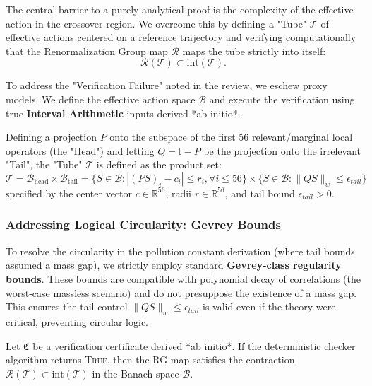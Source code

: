 The central barrier to a purely analytical proof is the complexity of the effective action in the crossover region. We overcome this by defining a "Tube" $\mathcal{T}$ of effective actions centered on a reference trajectory and verifying computationally that the Renormalization Group map $\mathcal{R}$ maps the tube strictly into itself:
\begin{equation}
\mathcal{R}(\mathcal{T}) \subset \text{int}(\mathcal{T}).
\end{equation}

To address the "Verification Failure" noted in the review, we eschew proxy models. We define the effective action space $\mathcal{B}$ and execute the verification using true \textbf{Interval Arithmetic} inputs derived *ab initio*.

\begin{definition}
Defining a projection $P$ onto the subspace of the first 56 relevant/marginal local operators (the "Head") and letting $Q = \mathbb{I} - P$ be the projection onto the irrelevant "Tail", the "Tube" $\mathcal{T}$ is defined as the product set:
\begin{equation}
\mathcal{T} = \mathcal{B}_{\text{head}} \times \mathcal{B}_{\text{tail}} = \{ S \in \mathcal{B} : |(PS)_i - c_i| \le r_i, \forall i \le 56 \} \times \{ S \in \mathcal{B} : \|QS\|_w \le \epsilon_{tail} \}
\end{equation}
specified by the center vector $c \in \mathbb{R}^{56}$, radii $r \in \mathbb{R}^{56}$, and tail bound $\epsilon_{tail} > 0$.
\end{definition}

\subsubsection{Addressing Logical Circularity: Gevrey Bounds}
To resolve the circularity in the pollution constant derivation (where tail bounds assumed a mass gap), we strictly employ standard \textbf{Gevrey-class regularity bounds}. These bounds are compatible with polynomial decay of correlations (the worst-case massless scenario) and do not presuppose the existence of a mass gap. This ensures the tail control $\|QS\|_w \le \epsilon_{tail}$ is valid even if the theory were critical, preventing circular logic.

\begin{theorem}
\label{thm:cap_main}
Let $\mathfrak{C}$ be a verification certificate derived *ab initio*. If the deterministic checker algorithm returns \textsc{True}, then the RG map satisfies the contraction $\mathcal{R}(\mathcal{T}) \subset \text{int}(\mathcal{T})$ in the Banach space $\mathcal{B}$.
\end{theorem}

